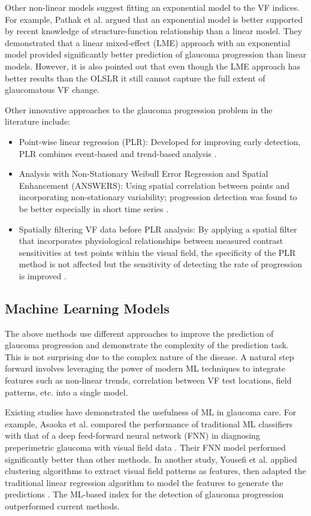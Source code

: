Other non-linear models suggest fitting an exponential model to the \acl{VF} indices. For example, Pathak et al. argued that an exponential model is better supported by recent knowledge of structure-function relationship than a linear model. \cite{Pathak2013} They demonstrated that a linear mixed-effect (LME) approach with an exponential model provided significantly better prediction of glaucoma progression than linear models. However, it is also pointed out that even though the LME approach has better results than the \ac{OLSLR} it still cannot capture the full extent of glaucomatous \acl{VF} change.

Other innovative approaches to the glaucoma progression problem in the literature include:

\begin{itemize}
	\item Point-wise linear regression (PLR): Developed for improving early detection, PLR combines event-based and trend-based analysis \cite{Nouri-Mahdavi2005}. 
	\item Analysis with Non-Stationary Weibull Error Regression and Spatial Enhancement (ANSWERS): Using spatial correlation between points and incorporating non-stationary variability; progression detection was found to be better especially in short time series \cite{Zhu2015}.
	\item Spatially filtering \acl{VF} data before PLR analysis: By applying a spatial filter that incorporates physiological relationships between measured contrast sensitivities at test points within the visual field, the specificity of the PLR method is not affected but the sensitivity of detecting the rate of progression is improved \cite{Strouthidis}.
\end{itemize}

\subsection{Machine Learning Models}

The above methods use different approaches to improve the prediction of glaucoma progression and demonstrate the complexity of the prediction task. This is not surprising due to the complex nature of the disease. A natural step forward involves leveraging the power of modern \ac{ML} techniques to integrate features such as non-linear trends, correlation between \acl{VF} test locations, field patterns, etc. into a single model.
 
Existing studies have demonstrated the usefulness of \ac{ML} in glaucoma care. For example, Asaoka et al. compared the performance of traditional ML classifiers with that of a deep feed-forward neural network (FNN) in diagnosing preperimetric glaucoma with visual field data \cite{Asaoka2016}. Their FNN model performed significantly better than other methods. In another study, Yousefi et al. applied clustering algorithms to extract visual field patterns as features, then adapted the traditional linear regression algorithm to model the features to generate the predictions \cite{Yousefi2018}. The \ac{ML}-based index for the detection of glaucoma progression outperformed current methods. 

